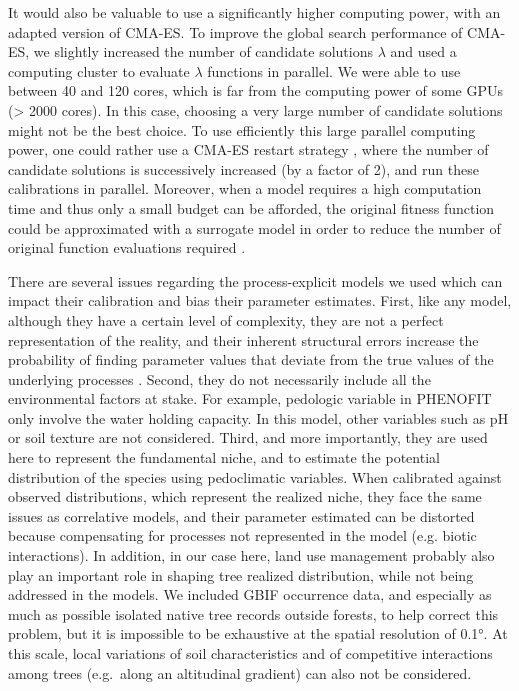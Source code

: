 It would also be valuable to use a significantly higher computing power,
with an adapted version of CMA-ES. To improve the global search
performance of CMA-ES, we slightly increased the number of candidate
solutions \(\lambda\) \citep{Hansen2004} and used a computing cluster to evaluate \(\lambda\) functions in
parallel. We were able to use between 40 and 120 cores, which is far
from the computing power of some GPUs (\textgreater{} 2000 cores). In
this case, choosing a very large number of candidate solutions might not
be the best choice. To use efficiently this large parallel computing
power, one could rather use a CMA-ES restart strategy \citep[e.g. IPOP-CMA-ES,][]{Auger2005}, where the
number of candidate solutions is successively increased (by a factor of
2), and run these calibrations in parallel. Moreover, when a model
requires a high computation time and thus only a small budget can be
afforded, the original fitness function could be approximated with a
surrogate model in order to reduce the number of original function
evaluations required \citep[e.g.][]{Auger2004, Loshchilov2013}. 

There are several issues regarding the process-explicit models we used
which can impact their calibration and bias their parameter estimates.
First, like any model, although they have a certain level of complexity,
they are not a perfect representation of the reality, and their inherent
structural errors increase the probability of finding parameter values
that deviate from the true values of the underlying processes \citep[see][]{Oberpriller2021}. Second, they do not necessarily include all the environmental
factors at stake. For example, pedologic variable in PHENOFIT only
involve the water holding capacity. In this model, other variables such
as pH or soil texture are not considered. Third, and more importantly,
they are used here to represent the fundamental niche, and to estimate
the potential distribution of the species using pedoclimatic variables.
When calibrated against observed distributions, which represent the
realized niche, they face the same issues as correlative models, and
their parameter estimated can be distorted because compensating for
processes not represented in the model (e.g. biotic interactions). In
addition, in our case here, land use management probably also play an
important role in shaping tree realized distribution, while not being
addressed in the models. We included GBIF occurrence data, and
especially as much as possible isolated native tree records outside
forests, to help correct this problem, but it is impossible to be
exhaustive at the spatial resolution of 0.1°. At this scale, local
variations of soil characteristics and of competitive interactions among
trees (e.g.~along an altitudinal gradient) can also not be considered.

